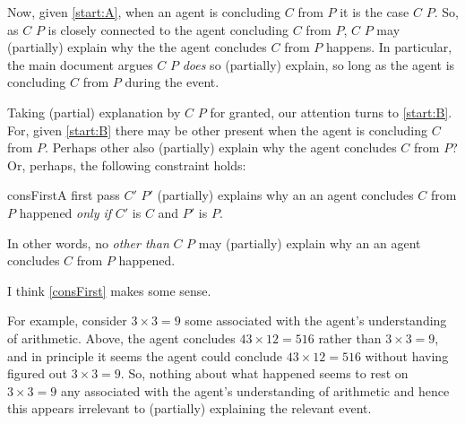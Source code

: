 \begin{note}
  Now, given \ref{start:A}, when an agent is concluding \(C\) from \(P\) it is the case \(C\) \fof{} \(P\).
  So, as \(C\)  \(P\) is closely connected to the agent concluding \(C\) from \(P\), \(C\)  \(P\) may (partially) explain why the \eiw{} the agent concludes \(C\) from \(P\) happens.
  In particular, the main document argues \(C\)  \(P\) \emph{does} so (partially) explain, so long as the agent is concluding \(C\) from \(P\) during the event.

  Taking (partial) explanation by \(C\)  \(P\) for granted, our attention turns to \ref{start:B}.
  For, given \ref{start:B} there may be other  present when the agent is concluding \(C\) from \(P\).
  Perhaps other  also (partially) explain why the agent concludes \(C\) from \(P\)?
  Or, perhaps, the following constraint holds:

  \begin{constraint}{consFirst}{A first pass}
    \(C'\) \fingf{} \(P'\) (partially) explains why an  an agent concludes \(C\) from \(P\) happened \emph{only if} \(C'\) is \(C\) and \(P'\) is \(P\).
  \end{constraint}

  \noindent%
  In other words, no \fingfr{} \emph{other than} \(C\) \fingf{} \(P\) may (partially) explain why an  an agent concludes \(C\) from \(P\) happened.
\end{note}


\begin{note}
  I think \autoref{consFirst} makes some sense.

  For example, consider \(3 \times 3 = 9\) \fingf{} some \pool{} associated with the agent's understanding of arithmetic.
  Above, the agent concludes \(43 \times 12 = 516\) rather than \(3 \times 3 = 9\), and in principle it seems the agent could conclude \(43 \times 12 = 516\) without having figured out \(3 \times 3 = 9\).
  So, nothing about what happened seems to rest on \(3 \times 3 = 9\) \fingf{} any \pool{} associated with the agent's understanding of arithmetic and hence this \fingfr{} appears irrelevant to (partially) explaining the relevant event.
\end{note}


